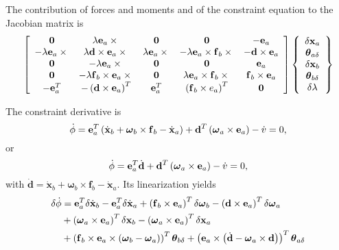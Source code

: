 \documentclass[10pt,dvips,fleqn,subeqn]{report}
\newcommand{\T}[1]{\bm{\mathbf{#1}}}
\begin{document}
The contribution of forces and moments and of the constraint equation 
to the Jacobian matrix is
\begin{equation}
	\sqbr{\matr{ccccc}{
		\T{0} & \lambda \T{e}_a \times{} & \T{0} & \T{0} & - \T{e}_a \\
		- \lambda \T{e}_a \times{} & \lambda \T{d}\times\T{e}_a\times{} & 
			\lambda \T{e}_a \times{} & - \lambda \T{e}_a \times \T{f}_b\times{} &
			- \T{d}\times\T{e}_a \\
		\T{0} & - \lambda \T{e}_a \times{} & \T{0} & \T{0} & \T{e}_a \\
		\T{0} & - \lambda \T{f}_b \times \T{e}_a \times{} &
			\T{0} & \lambda \T{e}_a\times\T{f}_b\times{} & \T{f}_b\times\T{e}_a \\
		- \T{e}_a^T & - \plbr{\T{d} \times \T{e}_a}^T &
			\T{e}_a^T & \plbr{\T{f}_b\times{e}_a}^T & \T{0}
	}}\cubr{\cvvect{
		\delta\T{x}_a \\
		\T{\theta}_{a\delta} \\
		\delta\T{x}_b \\
		\T{\theta}_{b\delta} \\
		\delta\lambda
	}}
\end{equation}

The constraint derivative is
\begin{equation}
	\dot{\phi} = \T{e}_a^T\plbr{
		\dot{\T{x}}_b
		+ \T{\omega}_b \times \T{f}_b
		- \dot{\T{x}}_a
	} + \T{d}^T \plbr{\T{\omega}_a \times \T{e}_a} - \dot{v} = 0 ,
\end{equation}
or
\begin{equation}
	\dot{\phi} = \T{e}_a^T \dot{\T{d}}
	+ \T{d}^T \plbr{\T{\omega}_a \times \T{e}_a} - \dot{v} = 0 ,
\end{equation}
with $\dot{\T{d}}=\dot{\T{x}}_b+\T{\omega}_b\times\T{f}_b-\dot{\T{x}}_a$.
Its linearization yields
\begin{align}
	\delta\dot{\phi} &= \T{e}_a^T \delta\dot{\T{x}}_b
	- \T{e}_a^T \delta\dot{\T{x}}_a
	+ \plbr{\T{f}_b \times \T{e}_a}^T \delta\T{\omega}_b
	- \plbr{\T{d} \times \T{e}_a}^T \delta\T{\omega}_a \nonumber \\
	& + \plbr{\T{\omega}_a \times \T{e}_a}^T \delta\T{x}_b
	- \plbr{\T{\omega}_a \times \T{e}_a}^T \delta\T{x}_a \nonumber \\
	& + \plbr{\T{f}_b \times \T{e}_a \times \plbr{\T{\omega}_b - \T{\omega}_a}}^T \T{\theta}_{b\delta}
	+ \plbr{\T{e}_a \times \plbr{\dot{\T{d}} - \T{\omega}_a \times \T{d}}}^T \T{\theta}_{a\delta}
\end{align}
\end{document}
